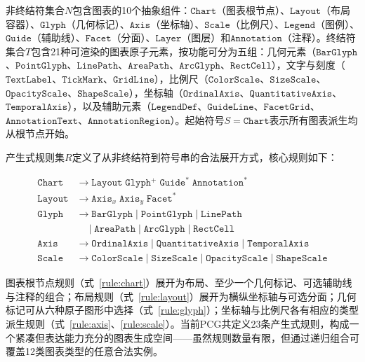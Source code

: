 非终结符集合$N$包含图表的10个抽象组件：$\texttt{Chart}$（图表根节点）、$\texttt{Layout}$（布局容器）、$\texttt{Glyph}$（几何标记）、$\texttt{Axis}$（坐标轴）、$\texttt{Scale}$（比例尺）、$\texttt{Legend}$（图例）、$\texttt{Guide}$（辅助线）、$\texttt{Facet}$（分面）、$\texttt{Layer}$（图层）和$\texttt{Annotation}$（注释）。终结符集合$T$包含21种可渲染的图表原子元素，按功能可分为五组：几何元素（$\texttt{BarGlyph}$、$\texttt{PointGlyph}$、$\texttt{LinePath}$、$\texttt{AreaPath}$、$\texttt{ArcGlyph}$、$\texttt{RectCell}$），文字与刻度（$\texttt{TextLabel}$、$\texttt{TickMark}$、$\texttt{GridLine}$），比例尺（$\texttt{ColorScale}$、$\texttt{SizeScale}$、$\texttt{OpacityScale}$、$\texttt{ShapeScale}$），坐标轴（$\texttt{OrdinalAxis}$、$\texttt{QuantitativeAxis}$、$\texttt{TemporalAxis}$），以及辅助元素（$\texttt{LegendDef}$、$\texttt{GuideLine}$、$\texttt{FacetGrid}$、$\texttt{AnnotationText}$、$\texttt{AnnotationRegion}$）。起始符号$S = \texttt{Chart}$表示所有图表派生均从根节点开始。

产生式规则集$R$定义了从非终结符到符号串的合法展开方式，核心规则如下：

\begin{align}
    \texttt{Chart}    &\to \texttt{Layout} \; \texttt{Glyph}^+ \; \texttt{Guide}^* \; \texttt{Annotation}^* \label{rule:chart} \\
    \texttt{Layout}   &\to \texttt{Axis}_x \; \texttt{Axis}_y \; \texttt{Facet}^* \label{rule:layout} \\
    \texttt{Glyph}    &\to \texttt{BarGlyph} \mid \texttt{PointGlyph} \mid \texttt{LinePath} \nonumber\\
                      &\quad \mid \texttt{AreaPath} \mid \texttt{ArcGlyph} \mid \texttt{RectCell} \label{rule:glyph} \\
    \texttt{Axis}     &\to \texttt{OrdinalAxis} \mid \texttt{QuantitativeAxis} \mid \texttt{TemporalAxis} \label{rule:axis} \\
    \texttt{Scale}    &\to \texttt{ColorScale} \mid \texttt{SizeScale} \mid \texttt{OpacityScale} \mid \texttt{ShapeScale} \label{rule:scale}
\end{align}

图表根节点规则（式~\ref{rule:chart}）展开为布局、至少一个几何标记、可选辅助线与注释的组合；布局规则（式~\ref{rule:layout}）展开为横纵坐标轴与可选分面；几何标记可从六种原子图形中选择（式~\ref{rule:glyph}）；坐标轴与比例尺各有相应的类型派生规则（式~\ref{rule:axis}、\ref{rule:scale}）。当前PCG共定义23条产生式规则，构成一个紧凑但表达能力充分的图表生成空间——虽然规则数量有限，但通过递归组合可覆盖12类图表类型的任意合法实例。

